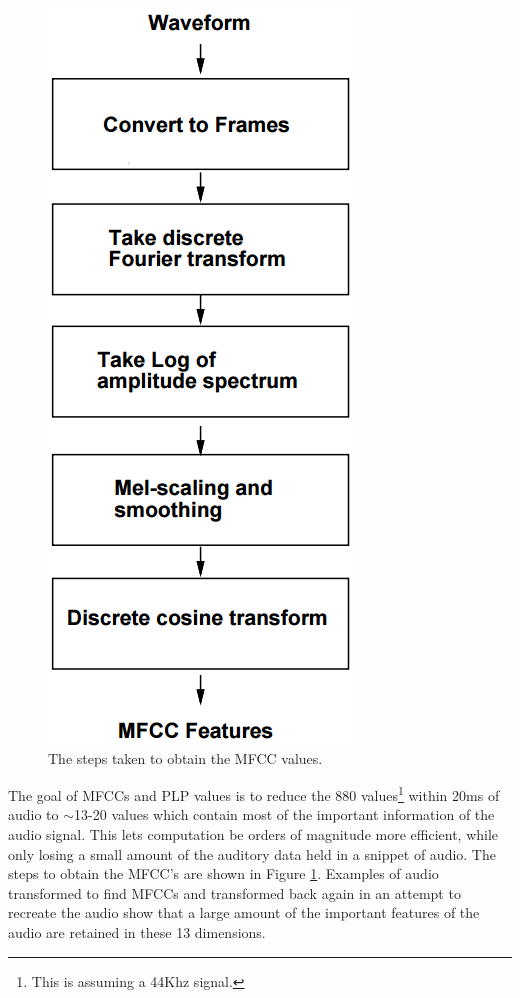 \documentclass[a4paper,11pt,notitlepage]{article}
\begin{document}
\begin{figure}[H]
	\centering
	\includegraphics[scale = 0.6]{figs/mfcc}
	\caption{The steps taken to obtain the MFCC values.\cite{logan2000mel}}
	\label{mfcc}
\end{figure}
The goal of MFCCs and PLP values is to reduce the 880 values\footnote{This is assuming a 44Khz signal.} within 20ms of audio to $\sim$13-20 values which contain most of the important information of the audio signal. This lets computation be orders of magnitude more efficient, while only losing a small amount of the auditory data held in a snippet of audio. The steps to obtain the MFCC's are shown in Figure \ref{mfcc}. Examples of audio transformed to find MFCCs and transformed back again in an attempt to recreate the audio show that a large amount of the important features of the audio are retained in these 13 dimensions.\cite{Ellis05-rastamat}\\
\end{document}
